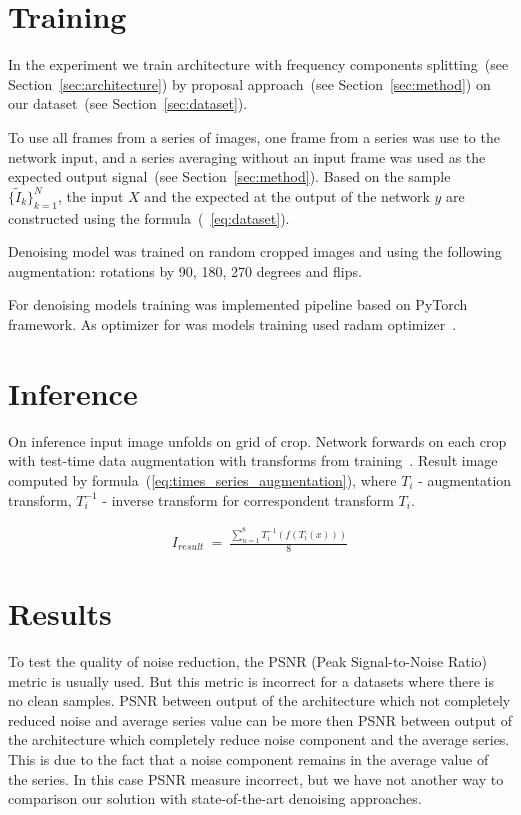 \documentclass[runningheads]{llncs}
\begin{document}
\section{Training}

In the experiment we train architecture with frequency components splitting~(see Section~\ref{sec:architecture}) by proposal approach~(see Section~\ref{sec:method}) on our dataset~(see Section~\ref{sec:dataset}).

To use all frames from a series of images, one frame from a series was use to the network input, and a series averaging without an input frame was used as the expected output signal~(see Section~\ref{sec:method}). Based on the sample \\$\{\tilde{I} _k\} _ {k=1}^{N}$, the input $X$ and the expected at the output of the network $y$ are constructed using the formula~(~\ref{eq:dataset}).

Denoising model was trained on random cropped images and using the following augmentation: rotations by 90, 180, 270 degrees and flips.

For denoising models training was implemented pipeline based on PyTorch framework. As optimizer for was models training used radam optimizer~\cite{radam_paper}.

\section{Inference}
On inference input image unfolds on grid of crop. Network forwards on each crop with test-time data augmentation with transforms from training~\cite{test_ts_augmentations_paper}. Result image computed by formula~(\ref{eq:times_series_augmentation}), where $T_{i}$ - augmentation transform, $T_{i}^{-1}$ - inverse transform for correspondent transform $T_{i}$.

\begin{eqnarray}\label{eq:times_series_augmentation}
I_{result}\ =\ \frac{\sum_{n=1}^{8} T_{i}^{-1}(f(T_{i}(x)))}{8}
\end{eqnarray}


\section{Results}
To test the quality of noise reduction, the PSNR (Peak Signal-to-Noise Ratio) metric is usually used. But this metric is incorrect for a datasets where there is no clean samples. PSNR between output of the architecture which not completely reduced noise and average series value can be more then PSNR between output of the architecture which completely reduce noise component and the average series. This is due to the fact that a noise component remains in the average value of the series. In this case PSNR measure incorrect, but we have not another way to comparison our solution with state-of-the-art denoising approaches.
\end{document}
